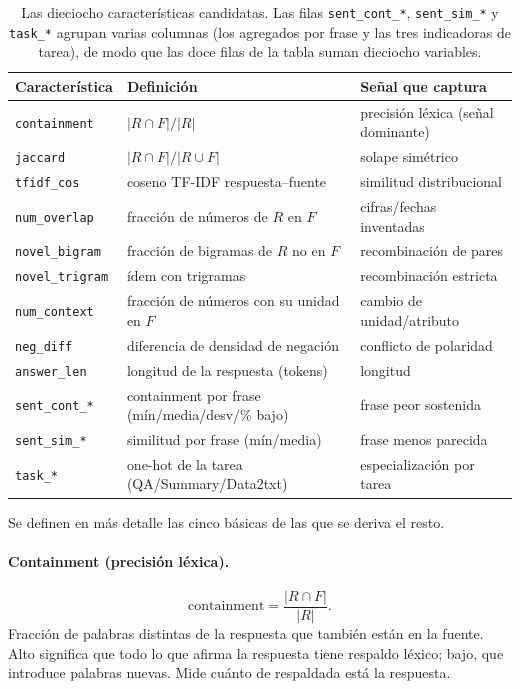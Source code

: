 \documentclass[12pt,a4paper]{report}
\theoremstyle{definition}
\newcommand{\tc}[1]{\texttt{#1}}
\begin{document}
\begin{table}[H]
  \centering
  \small
  \begin{tabular}{lp{5.1cm}p{5.0cm}}
  \toprule
  Característica & Definición & Señal que captura \\
  \midrule
  \tc{containment} & $|R\cap F|/|R|$ & precisión léxica (señal dominante) \\
  \tc{jaccard} & $|R\cap F|/|R\cup F|$ & solape simétrico \\
  \tc{tfidf\_cos} & coseno TF-IDF respuesta--fuente & similitud distribucional \\
  \tc{num\_overlap} & fracción de números de $R$ en $F$ & cifras/fechas inventadas \\
  \tc{novel\_bigram} & fracción de bigramas de $R$ no en $F$ & recombinación de pares \\
  \tc{novel\_trigram} & ídem con trigramas & recombinación estricta \\
  \tc{num\_context} & fracción de números con su unidad en $F$ & cambio de unidad/atributo \\
  \tc{neg\_diff} & diferencia de densidad de negación & conflicto de polaridad \\
  \tc{answer\_len} & longitud de la respuesta (tokens) & longitud \\
  \tc{sent\_cont\_*} & containment por frase (mín/media/desv/\% bajo) & frase peor sostenida \\
  \tc{sent\_sim\_*} & similitud por frase (mín/media) & frase menos parecida \\
  \tc{task\_*} & one-hot de la tarea (QA/Summary/Data2txt) & especialización por tarea \\
  \bottomrule
  \end{tabular}
  \caption{Las dieciocho características candidatas. Las filas \tc{sent\_cont\_*}, \tc{sent\_sim\_*} y
  \tc{task\_*} agrupan varias columnas (los agregados por frase y las tres indicadoras de tarea), de
  modo que las doce filas de la tabla suman dieciocho variables.}
  \label{tab:feats}
  \end{table}

Se definen en más detalle las cinco básicas de las que se deriva el resto.

\paragraph{Containment (precisión léxica).}
\begin{equation}
\text{containment} = \frac{|R \cap F|}{|R|}.
\end{equation}
Fracción de palabras distintas de la respuesta que también están en la fuente. Alto
significa que todo lo que afirma la respuesta tiene respaldo léxico; bajo, que introduce
palabras nuevas. Mide cuánto de respaldada está la respuesta.
\end{document}
